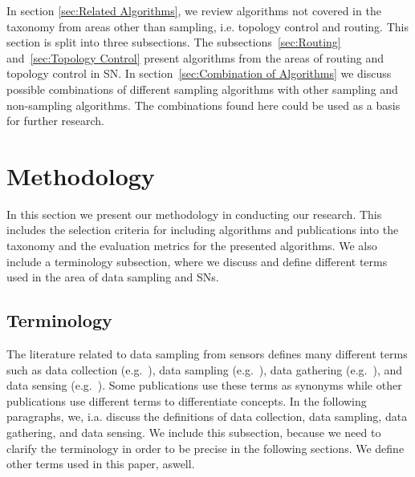  In section \ref{sec:Related
Algorithms}, we review algorithms not covered in the taxonomy from areas other
than sampling, i.e. topology control and routing. This section is split into
three subsections. The subsections~\ref{sec:Routing} and~\ref{sec:Topology
Control} present algorithms from the areas of routing and topology control in
\ac{SN}. In section~\ref{sec:Combination of Algorithms} we discuss possible
combinations of different sampling algorithms with other sampling and
non-sampling algorithms. The combinations found here could be used as a basis
for further research.

\section{Methodology}
\label{sec:Methodology}

In this section we present our methodology in conducting our research. This
includes the selection criteria for including algorithms and publications into
the taxonomy and the evaluation metrics for the presented algorithms. We also
include a terminology subsection, where we discuss and define different terms
used in the area of data sampling and \acp{SN}.

\subsection{Terminology}
\label{sec:Terminology}

The literature related to data sampling from sensors defines many different
terms such as data collection (e.g.~\cite{laiymani2013adaptive, liu2007energy,
wang2012adaptive}), data sampling (e.g.~\cite{willett2004backcasting,
jain2004adaptive, szczytowski2010asample}), data gathering
(e.g.~\cite{wang2012data, luo2009compressive, zhang2016data}), and data sensing
(e.g.~\cite{padhy2006utility, mahmudimanesh2012balanced, duarte2005joint}).
Some publications use these terms as synonyms while other publications use
different terms to differentiate concepts. In the following paragraphs, we,
i.a. discuss the definitions of data collection, data sampling, data gathering,
and data sensing. We include this subsection, because we need to clarify the
terminology in order to be precise in the following sections. We define other
terms used in this paper, aswell.


